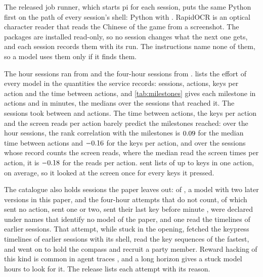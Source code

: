 \documentclass{article} %
\begin{document}
The released job runner, which starts pi for each session, puts the same Python first on the path of every session's shell: Python \ToolkitPython{} with \ToolkitPackages{}. RapidOCR is an optical character reader that reads the Chinese of the game from a screenshot. The packages are installed read-only, so no session changes what the next one gets, and each session records them with its run. The instructions name none of them, so a model uses them only if it finds them.

The hour sessions ran from \FieldDates{} and the four-hour sessions from \LongDates{}.  lists the effort of every model in the quantities the service records: sessions, actions, keys per action and the time between actions, and \cref{tab:milestones} gives each milestone in actions and in minutes, the medians over the sessions that reached it. The sessions took between \EactsMin{} and \EactsMax{} actions. The time between actions, the keys per action and the screen reads per action barely predict the milestones reached: over the \NcadenceSessions{} hour sessions, the rank correlation with the milestones is $0.09$ for the median time between actions and $-0.16$ for the keys per action, and over the \NlookSessions{} sessions whose record counts the screen reads, where the median read the screen \ClookMedian{} times per action, it is $-0.18$ for the reads per action. \PbatchLabel{} sent lists of up to \PbatchMaxKeys{} keys in one action, \PbatchKeysPerAction{} on average, so it looked at the screen once for every \PbatchKeysPerAction{} keys it pressed.

The catalogue also holds sessions the paper leaves out: \NexcludedSessions{} of \LexcludedLabel{}, a model with two later versions in this paper, and the \NlongWithheld{} four-hour attempts that do not count, of which \NlongZero{} sent no action, \NlongStartup{} sent one or two, \NlongEarly{} sent their last key before minute \NlongMinLastMin{}, \NlongExcluded{} were declared under names that identify no model of the paper, and one read the timelines of earlier sessions. That attempt, while stuck in the opening, fetched the keypress timelines of earlier sessions with its shell, read the key sequences of the fastest, and went on to hold the compass and recruit a party member. Reward hacking of this kind is common in agent traces \citep{shao2026validity}, and a long horizon gives a stuck model hours to look for it. The release lists each attempt with its reason.
\end{document}
